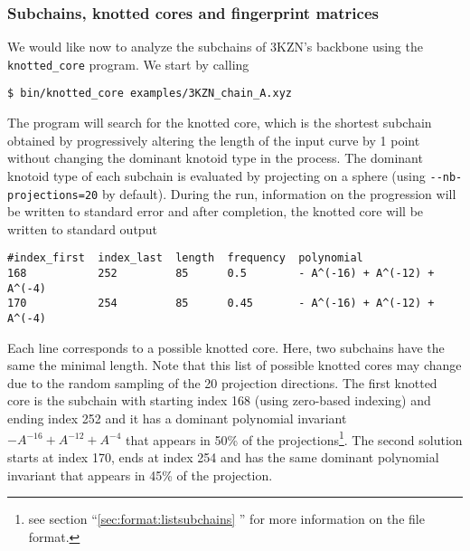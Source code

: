 \subsubsection{Subchains, knotted cores and fingerprint matrices}
We would like now to analyze the subchains of 3KZN's backbone using the \lstinline{knotted_core} program. We start by calling
\begin{lstlisting}
$ bin/knotted_core examples/3KZN_chain_A.xyz 
\end{lstlisting}
The program will search for the knotted core, which is the shortest subchain obtained by progressively altering the length of the input curve by 1 point without changing the dominant knotoid type in the process. The dominant knotoid type of each subchain is evaluated by projecting on a sphere (using \lstinline{--nb-projections=20} by default). During the run, information on the progression will be written to standard error and after completion, the knotted core will be written to standard output
\begin{lstlisting}
#index_first  index_last  length  frequency  polynomial
168           252         85      0.5        - A^(-16) + A^(-12) + A^(-4)
170           254         85      0.45       - A^(-16) + A^(-12) + A^(-4)
\end{lstlisting}
Each line corresponds to a possible knotted core. Here, two subchains have the same the minimal length. Note that this list of possible knotted cores may change due to the random sampling of the 20 projection directions. The first knotted core is the subchain with starting index 168 (using zero-based indexing) and ending index 252 and it has a dominant polynomial invariant $-A^{-16}+A^{-12}+A^{-4}$ that appears in 50\% of the projections\footnote{see section ``\ref{sec:format:listsubchains} '' for more information on the file format.}. The second solution starts at index 170, ends at index 254 and has the same dominant polynomial invariant that appears in 45\% of the projection.

